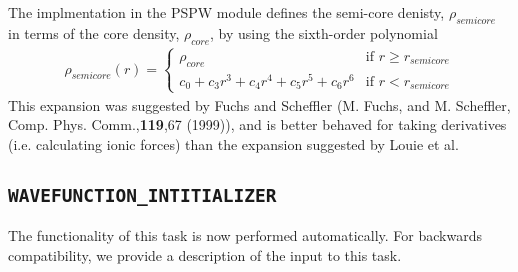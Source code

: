 The implmentation in the PSPW module defines the semi-core denisty, $\rho_{semicore}$ in terms of 
the core density, $\rho_{core}$, by using the sixth-order polynomial
\begin{eqnarray}
\rho_{semicore}(r) = \left\{ \begin{array}{ll}
                              \rho_{core} & \mbox{if $r \geq r_{semicore}$} \\
                              c_0 + c_3 r^3 + c_4 r^4 + c_5 r^5 + c_6 r^6 &  \mbox{if $r < r_{semicore}$}
                            \end{array}
                     \right.
\end{eqnarray}
This expansion was suggested by Fuchs and Scheffler 
(M. Fuchs, and M. Scheffler, Comp. Phys. Comm.,\textbf{119},67 (1999)), 
and is better behaved for taking derivatives (i.e. calculating ionic forces) than the expansion suggested 
by Louie et al.




\subsection{\tt WAVEFUNCTION\_INTITIALIZER}
\label{sec:pspw_wavefunction_initializer}
The functionality of this task is now performed automatically. For backwards 
compatibility, we provide a description of the input to this task.

